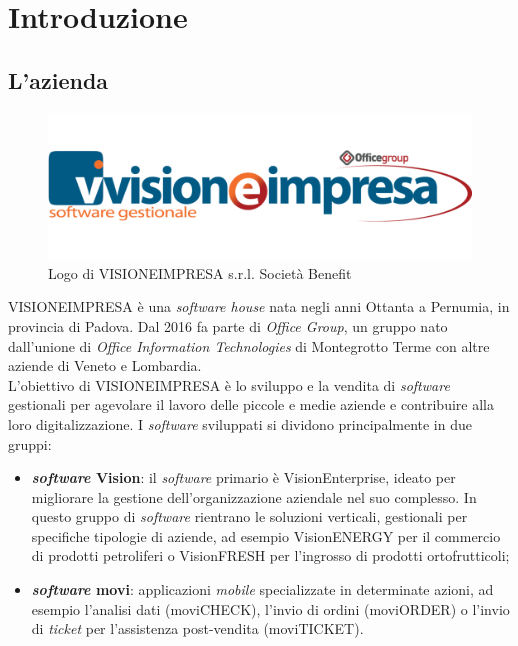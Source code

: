 \chapter{Introduzione}
\label{cap:introduzione}

\section{L'azienda}

\vspace{-3mm}

\begin{figure}[!h]
    \centering 
    \includegraphics[width=0.6\columnwidth]{images/logo-visioneimpresa.png} 
    \caption{Logo di VISIONEIMPRESA s.r.l. Società Benefit}
\end{figure}

\noindent VISIONEIMPRESA è una \textit{software house} nata negli anni Ottanta a Pernumia, in provincia di Padova. Dal 2016 fa parte di \textit{Office Group}, un gruppo nato dall'unione di \textit{Office Information Technologies} di Montegrotto Terme con altre aziende di Veneto e Lombardia.\\
L'obiettivo di VISIONEIMPRESA è lo sviluppo e la vendita di \textit{software} gestionali per agevolare il lavoro delle piccole e medie aziende e contribuire alla loro digitalizzazione. I \textit{software} sviluppati si dividono principalmente in due gruppi:
\begin{itemize}
    \item \textbf{\textit{software} Vision}: il \textit{software} primario è VisionEnterprise, ideato per migliorare la gestione dell'organizzazione aziendale nel suo complesso. In questo gruppo di \textit{software} rientrano le soluzioni verticali, gestionali per specifiche tipologie di aziende, ad esempio VisionENERGY per il commercio di prodotti petroliferi o VisionFRESH per l'ingrosso di prodotti ortofrutticoli;
    \item \textbf{\textit{software} movi}: applicazioni \textit{mobile} specializzate in determinate azioni, ad esempio l'analisi dati (moviCHECK), l'invio di ordini (moviORDER) o l'invio di \textit{ticket} per l'assistenza post-vendita (moviTICKET).
\end{itemize}

